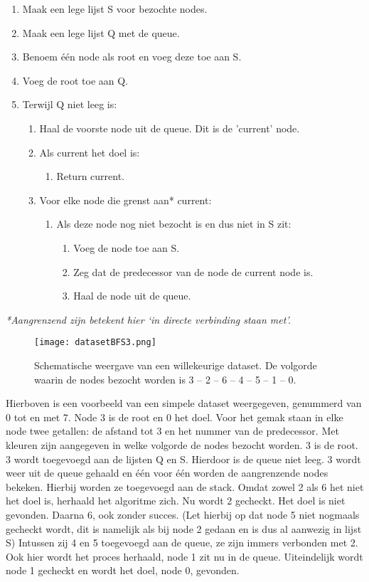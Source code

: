 \begin{enumerate}
\item Maak een lege lijst S voor bezochte nodes.
\item Maak een lege lijst Q met de queue.
\item Benoem één node als root en voeg deze toe aan S.
\item Voeg de root toe aan Q.
\item Terwijl Q niet leeg is:
	\begin{enumerate}
	\item Haal de voorste node uit de queue. Dit is de 'current' node.
	\item Als current het doel is:
		\begin{enumerate}
		\item Return current.
		\end{enumerate}
	\item Voor elke node die grenst aan* current:
		\begin{enumerate}
		\item Als deze node nog niet bezocht is en dus niet in S zit:
			\begin{enumerate}
			\item Voeg de node toe aan S.
			\item Zeg dat de predecessor van de node de current node is.
			\item Haal de node uit de queue.
			\end{enumerate}
		\end{enumerate}
	\end{enumerate}
\end{enumerate}

\textit{*Aangrenzend zijn betekent hier `in directe verbinding staan met'.}

\begin{figure}[h]
  \centering
    \texttt{[image: datasetBFS3.png]}
  \caption{Schematische weergave van een willekeurige dataset. De volgorde waarin de nodes bezocht worden is 3 – 2 – 6 – 4 – 5 – 1 – 0.}
  \label{fig:datasetBFS3}
\end{figure}

Hierboven is een voorbeeld van een simpele dataset weergegeven, genummerd van 0 tot en met 7. Node 3 is de root en 0 het doel. Voor het gemak staan in elke node twee getallen: de afstand tot 3 en het nummer van de predecessor. Met kleuren zijn aangegeven in welke volgorde de nodes bezocht worden.
3 is de root. 3 wordt toegevoegd aan de lijsten Q en S. Hierdoor is de queue niet leeg. 3 wordt weer uit de queue gehaald en één voor één worden de aangrenzende nodes bekeken. Hierbij worden ze toegevoegd aan de stack. Omdat zowel 2 als 6 het niet het doel is, herhaald het algoritme zich. Nu wordt 2 gecheckt. Het doel is niet gevonden. Daarna 6, ook zonder succes. (Let hierbij op dat node 5 niet nogmaals gecheckt wordt, dit is namelijk als bij node 2 gedaan en is dus al aanwezig in lijst S) Intussen zij 4 en 5 toegevoegd aan de queue, ze zijn immers verbonden met 2. Ook hier wordt het proces herhaald, node 1 zit nu in de queue. Uiteindelijk wordt node 1 gecheckt en wordt het doel, node 0, gevonden.

